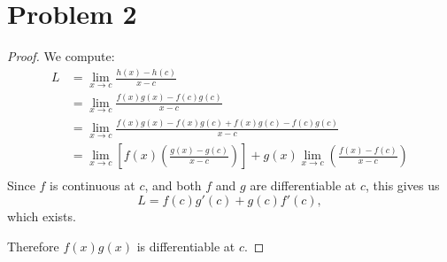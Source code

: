 \documentclass{article}
\begin{document}
\section*{Problem 2}
\begin{proof}
	We compute:
	\begin{align}
		L &= \lim \limits_{x \to c} \frac{h(x) - h(c)}{x - c} \\
		&= \lim\limits_{x \to c} \frac{f(x)g(x) - f(c)g(c)}{x - c} \\
		&= \lim\limits_{x \to c} \frac{f(x)g(x) - f(x)g(c) + f(x)g(c) - f(c)g(c)}{x - c} \\
		&= \lim\limits_{x \to c} \left[f(x) \left(\frac{g(x) - g(c)}{x - c}\right)\right] + g(x) \lim\limits_{x \to c}\left(\frac{f(x) - f(c)}{x - c}\right) \\ 
	\end{align}
	Since $f$ is continuous at $c$, and both $f$ and $g$ are differentiable at $c$, this gives us
	\begin{equation}
		L = f(c)g'(c) + g(c)f'(c),
	\end{equation}
	which exists.
	
	Therefore $f(x)g(x)$ is differentiable at $c$.
\end{proof}
\end{document}
